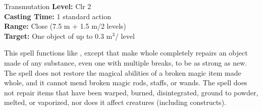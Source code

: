 {Transmutation}
{
	\textbf{Level:}
	Clr 2\\
	\textbf{Casting Time:}
	1 standard action\\
	\textbf{Range:}
	Close (7.5 m + 1.5 m/2 levels)\\
	\textbf{Target:}
	One object of up to 0.3 m$^3$/ level\\
}
{
	This spell functions like , except that make whole completely repairs an object made of any substance, even one with multiple breaks, to be as strong as new. The spell does not restore the magical abilities of a broken magic item made whole, and it cannot mend broken magic rods, staffs, or wands. The spell does not repair items that have been warped, burned, disintegrated, ground to powder, melted, or vaporized, nor does it affect creatures (including constructs).

}

